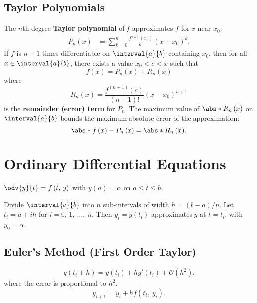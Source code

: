 \documentclass{article}
\begin{document}
\begin{multicols}{3}
    \subsection{Taylor Polynomials}
    The \(n\)th degree \textbf{Taylor polynomial} of \(f\)
    approximates \(f\) for \(x\) near \(x_0\):
    \begin{align*}
        P_n\left( x \right) & = \sum_{k = 0}^n \frac{f^{\left( k \right)}\left( x_0 \right)}{k!} \left( x - x_0 \right)^k.
    \end{align*}
    If \(f\) is \(n + 1\) times differentiable on \(\interval{a}{b}\) containing \(x_0\),
    then for all \(x \in \interval{a}{b}\),
    there exists a value \(x_0 < c < x\) such that
    \begin{equation*}
        f\left( x \right) = P_n\left( x \right) + R_n\left( x \right)
    \end{equation*}
    where
    \begin{equation*}
        R_n\left( x \right) = \frac{f^{\left( n + 1 \right)}\left( c \right)}{\left( n + 1 \right)!} \left( x - x_0 \right)^{n + 1}
    \end{equation*}
    is the \textbf{remainder (error) term} for \(P_n\).
    The maximum value of \(\abs*{R_n\left( x \right)}\) on \(\interval{a}{b}\) bounds the maximum absolute error of the approximation:
    \begin{equation*}
        \abs*{f\left( x \right) - P_n\left( x \right)} = \abs*{R_n\left( x \right)}.
    \end{equation*}
    \section{Ordinary Differential Equations}
    \(\odv{y}{t} = f\left( t,\: y \right)\) with \(y\left( a \right) = \alpha\) on \(a \leq t \leq b\).

    Divide \(\interval{a}{b}\) into \(n\) sub-intervals of width \(h = \left( b - a \right) / n\).
    Let \(t_i = a + i h\) for \(i = 0,\: 1,\: \ldots,\: n\).
    Then \(y_i = y\left( t_i \right)\) approximates \(y\) at \(t = t_i\), with \(y_0 = \alpha\).
    \subsection{Euler's Method (First Order Taylor)}
    \begin{equation*}
        y\left( t_i + h \right) = y\left( t_i \right) + h y'\left( t_i \right) + \mathcal{O}\left( h^2 \right).
    \end{equation*}
    where the error is proportional to \(h^2\).
    \begin{equation*}
        y_{i + 1} = y_i + h f\left( t_i,\: y_i \right).
    \end{equation*}

\end{multicols}
\end{document}
